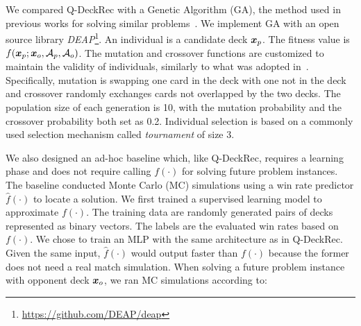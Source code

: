 We compared Q-DeckRec with a Genetic Algorithm (GA), the method used in previous works for solving similar problems~\citep{garcia2016evolutionary,bjorke2017deckbuilding}. We implement GA with an open source library \textit{DEAP}\footnote{\url{https://github.com/DEAP/deap}}. An individual is a candidate deck $\boldsymbol{x}_p$. The fitness value is $f(\boldsymbol{x}_p; \boldsymbol{x}_o, \mathcal{A}_p, \mathcal{A}_o)$. The mutation and crossover functions are customized to maintain the validity of individuals, similarly to what was adopted in~\textcite{bjorke2017deckbuilding}. Specifically, mutation is swapping one card in the deck with one not in the deck and crossover randomly exchanges cards not overlapped by the two decks. The population size of each generation is 10, with the mutation probability and the crossover probability both set as 0.2. Individual selection is based on a commonly used selection mechanism called \textit{tournament} of size 3. 


We also designed an ad-hoc baseline which, like Q-DeckRec, requires a learning phase and does not require calling $f(\cdot)$ for solving future problem instances. The baseline conducted Monte Carlo (MC) simulations using a win rate predictor $\hat{f}(\cdot)$ to locate a solution. We first trained a supervised learning model to approximate $f(\cdot)$. The training data are randomly generated pairs of decks represented as binary vectors. The labels are the evaluated win rates based on $f(\cdot)$. We chose to train an MLP with the same architecture as in Q-DeckRec. Given the same input, $\hat{f}(\cdot)$ would output faster than $f(\cdot)$ because the former does not need a real match simulation. When solving a future problem instance with opponent deck $\boldsymbol{x}_o$, we ran MC simulations according to:

